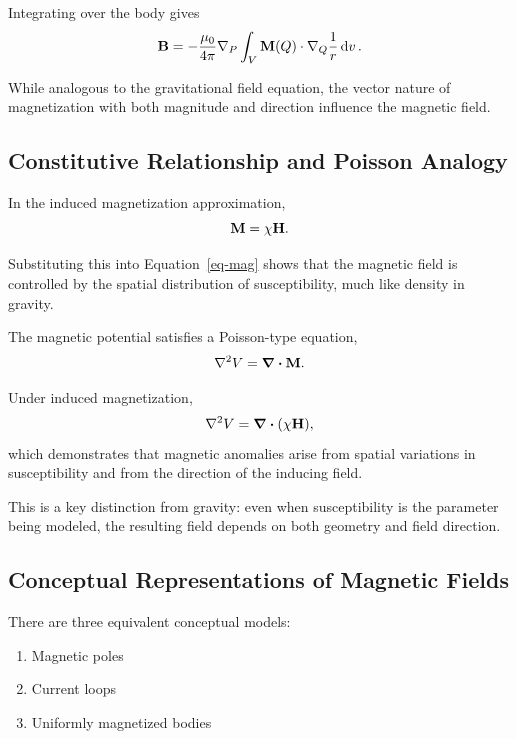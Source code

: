 Integrating over the body gives
\begin{equation}
    \vb{B} = - \frac{\mu_{0}}{4\pi} \nabla_{P} \int_{V} 
    \vb{M}(Q) \cdot \nabla_{Q} \frac{1}{r} \dd{v}.
    \label{eq-mag}
\end{equation}

While analogous to the gravitational field equation, the vector nature of magnetization with both magnitude and direction influence the magnetic field.

\subsection{Constitutive Relationship and Poisson Analogy}

In the induced magnetization approximation,
\begin{equation}
    \vb{M} = \chi \vb{H}.
\end{equation}

Substituting this into Equation~\ref{eq-mag} shows that the magnetic field is controlled by the spatial distribution of susceptibility, much like density in gravity.

The magnetic potential satisfies a Poisson-type equation,
\begin{equation}
    \laplacian V = \div \vb{M}.
\end{equation}

Under induced magnetization,
\begin{equation}
    \laplacian V = \div (\chi \vb{H}),
\end{equation}
which demonstrates that magnetic anomalies arise from spatial variations in susceptibility and from the direction of the inducing field.

This is a key distinction from gravity: even when susceptibility is the parameter being modeled, the resulting field depends on both geometry and field direction.

\subsection{Conceptual Representations of Magnetic Fields}

There are three equivalent conceptual models:

\begin{enumerate}
    \item Magnetic poles
    \item Current loops
    \item Uniformly magnetized bodies
\end{enumerate}

